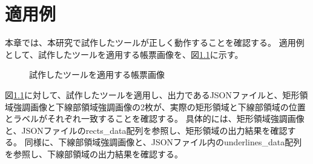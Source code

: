 \chapter{適用例}\label{cha:Indication}
本章では、本研究で試作したツールが正しく動作することを確認する。
適用例として、試作したツールを適用する帳票画像を、図\ref{fig:indication_original}に示す。

\begin{figure}[tp]
    \begin{center}
        \caption{試作したツールを適用する帳票画像}
        \label{fig:indication_original}
    \end{center}
\end{figure}

図\ref{fig:indication_original}に対して、試作したツールを適用し、出力であるJSONファイルと、矩形領域強調画像と下線部領域強調画像の2枚が、実際の矩形領域と下線部領域の位置とラベルがそれぞれ一致することを確認する。
具体的には、矩形領域強調画像と、JSONファイルのrects\_data配列を参照し、矩形領域の出力結果を確認する。
同様に、下線部領域強調画像と、JSONファイル内のunderlines\_data配列を参照し、下線部領域の出力結果を確認する。


